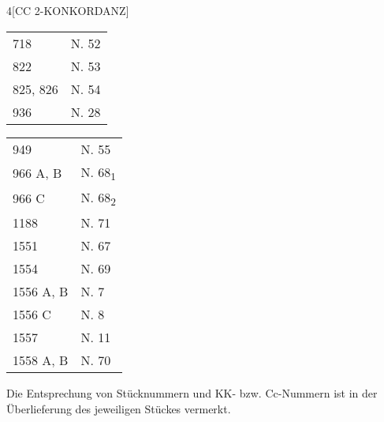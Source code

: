 \begin{multicols}{4}[\centering\footnotesize{\uppercase{Cc 2-Konkordanz}}]
\begin{tabular}{ll}
718 & N. 52\\
822 & N. 53\\
825, 826 & N. 54\\
936 & N. 28
\end{tabular}
\columnbreak
\begin{tabular}{ll}
949& N. 55\\
966 A, B & N. 68\textsubscript{1}\\
966 C & N. 68\textsubscript{2}\\
1188 & N. 71\\
1551 & N. 67\\
1554 & N. 69\\
1556 A, B & N. 7\\
1556 C & N. 8\\
1557 & N. 11\\
1558 A, B & N. 70
\end{tabular}
\vfill
\end{multicols}
\noindent Die Entsprechung von St\"{u}cknummern und KK- bzw. Cc-Nummern ist in der \"{U}berlieferung des jeweiligen St\"{u}ckes vermerkt.\\
